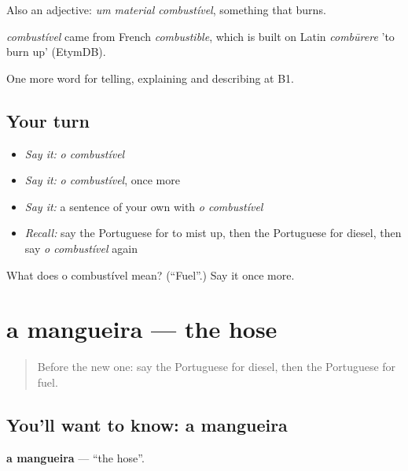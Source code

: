 Also an adjective: \emph{um material combustível}, something that burns.

\begin{cousinweb}
\emph{combustível} came from French \emph{combustible}, which is built on Latin \emph{combūrere} 'to burn up' (EtymDB).
\end{cousinweb}

\begin{grammarlens}[title={What you've built}]
One more word for telling, explaining and describing at B1.
\end{grammarlens}

\subsection*{Your turn}
\begin{itemize}
\raggedright
  \item \emph{Say it:} \emph{o combustível}
  \item \emph{Say it:} \emph{o combustível}, once more
  \item \emph{Say it:} a sentence of your own with \emph{o combustível}
  \item \emph{Recall:} say the Portuguese for to mist up, then the Portuguese for diesel, then say \emph{o combustível} again
\end{itemize}

\begin{tcolorbox}[breakable,colback=teal!4,colframe=teal!35!black,title={Before you move on}]
What does o combustível mean? (\textquotedblleft{}Fuel\textquotedblright{}.) Say it once more.
\end{tcolorbox}
\section[a mangueira]{a mangueira — the hose}

\label{lesson:PT-C404-mangueira}



\begin{quote}
Before the new one: say the Portuguese for diesel, then the Portuguese for fuel.
\end{quote}

\subsection*{You'll want to know: a mangueira}
\textbf{a mangueira} — \textquotedblleft{}the hose\textquotedblright{}.

